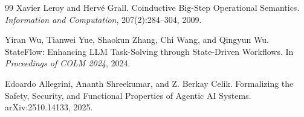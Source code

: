 \documentclass[11pt]{article}
\begin{document}
\begin{thebibliography}{99}
Xavier Leroy and Herv\'e Grall.
\newblock Coinductive Big-Step Operational Semantics.
\newblock \emph{Information and Computation}, 207(2):284--304, 2009.

Yiran Wu, Tianwei Yue, Shaokun Zhang, Chi Wang, and Qingyun Wu.
\newblock StateFlow: Enhancing LLM Task-Solving through State-Driven Workflows.
\newblock In \emph{Proceedings of COLM 2024}, 2024.

Edoardo Allegrini, Ananth Shreekumar, and Z. Berkay Celik.
\newblock Formalizing the Safety, Security, and Functional Properties of Agentic AI Systems.
\newblock arXiv:2510.14133, 2025.

\end{thebibliography}
\end{document}
